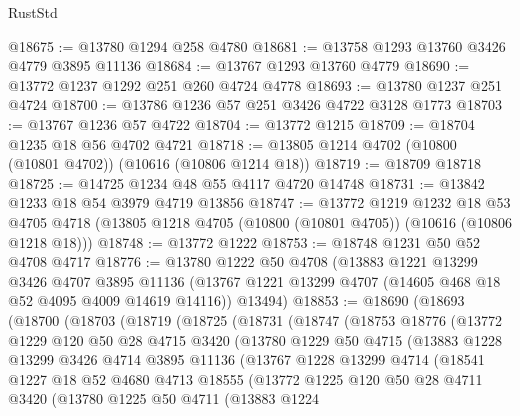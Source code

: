 \begin{lexlean}{RustStd}
\begin{coremodule}
@18675 := @13780 @1294 @258 @4780
@18681 := @13758 @1293 @13760 @3426 @4779 @3895 @11136
@18684 := @13767 @1293 @13760 @4779
@18690 := @13772 @1237 @1292 @251 @260 @4724 @4778
@18693 := @13780 @1237 @251 @4724
@18700 := @13786 @1236 @57 @251 @3426 @4722 @3128 @1773
@18703 := @13767 @1236 @57 @4722
@18704 := @13772 @1215
@18709 := @18704 @1235 @18 @56 @4702 @4721
@18718 := @13805 @1214 @4702 (@10800 (@10801 @4702)) (@10616 (@10806 @1214 @18))
@18719 := @18709 @18718
@18725 := @14725 @1234 @48 @55 @4117 @4720 @14748
@18731 := @13842 @1233 @18 @54 @3979 @4719 @13856
@18747 := @13772
    @1219
    @1232
    @18
    @53
    @4705
    @4718
    (@13805 @1218 @4705 (@10800 (@10801 @4705)) (@10616 (@10806 @1218 @18)))
@18748 := @13772 @1222
@18753 := @18748 @1231 @50 @52 @4708 @4717
@18776 := @13780
    @1222
    @50
    @4708
    (@13883
      @1221
      @13299
      @3426
      @4707
      @3895
      @11136
      (@13767 @1221 @13299 @4707 (@14605 @468 @18 @52 @4095 @4009 @14619 @14116))
      @13494)
@18853 := @18690
    (@18693
      (@18700
        (@18703
          (@18719
            (@18725
              (@18731
                (@18747
                  (@18753
                    @18776
                    (@13772
                      @1229
                      @120
                      @50
                      @28
                      @4715
                      @3420
                      (@13780
                        @1229
                        @50
                        @4715
                        (@13883
                          @1228
                          @13299
                          @3426
                          @4714
                          @3895
                          @11136
                          (@13767
                            @1228
                            @13299
                            @4714
                            (@18541
                              @1227
                              @18
                              @52
                              @4680
                              @4713
                              @18555
                              (@13772
                                @1225
                                @120
                                @50
                                @28
                                @4711
                                @3420
                                (@13780
                                  @1225
                                  @50
                                  @4711
                                  (@13883
                                    @1224

\end{coremodule}
\end{lexlean}
